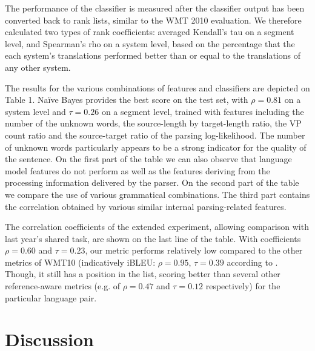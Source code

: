 \documentclass[11pt]{article}
\begin{document}
The performance of the classifier is measured after the classifier
output has been converted back to rank lists, similar to the WMT 2010
evaluation. We therefore calculated two types of rank coefficients: averaged
Kendall's tau on a segment level, and Spearman's rho on a system level, based
on the percentage that the each system's translations performed better than or equal to the translations
of any other system.

The results for the various combinations of features and classifiers are
depicted on Table 1. Naïve Bayes provides the best score on the test set, with
$\rho = 0.81$ on a system level and $\tau = 0.26$ on a segment level, trained
with features including the number of the unknown words, the source-length by target-length
ratio, the VP count ratio and the source-target ratio of the parsing
log-likelihood. The number of unknown words particularly appears to be a strong indicator for the quality of
the sentence. On the first part of the table we can also observe that language
model features do not perform as well as the features deriving from the
processing information delivered by the parser. On the second part of the table
we compare the use of various grammatical combinations. The third part
contains the correlation obtained by various similar internal parsing-related features.

The correlation coefficients of the extended experiment, allowing comparison
with last year's shared task, are shown on the last line of the table. With
coefficients $\rho = 0.60$ and $\tau = 0.23$, our metric performs relatively low
compared to the other metrics of WMT10 (indicatively iBLEU: $\rho = 0.95$, $\tau
= 0.39$ according to .
Though, it still has a position in the list, scoring better than several other reference-aware metrics
(e.g. of $\rho = 0.47$ and $\tau = 0.12$ respectively) for the particular
language pair. 

\section{Discussion}
\end{document}
